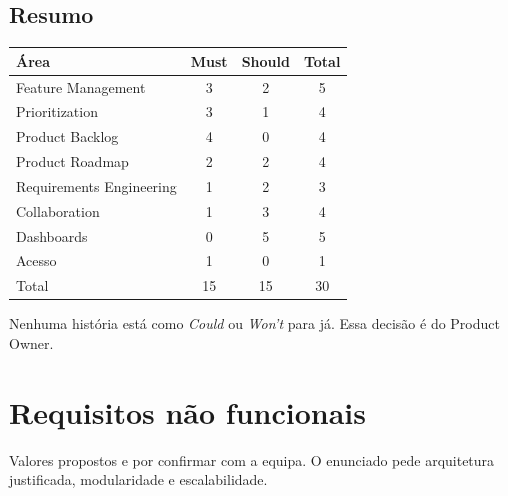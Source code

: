 \documentclass[12pt,a4paper]{article}
\begin{document}
\subsection{Resumo}

\begin{center}
\begin{tabular}{lccc}
\toprule
Área & Must & Should & Total \\
\midrule
Feature Management & 3 & 2 & 5 \\
Prioritization & 3 & 1 & 4 \\
Product Backlog & 4 & 0 & 4 \\
Product Roadmap & 2 & 2 & 4 \\
Requirements Engineering & 1 & 2 & 3 \\
Collaboration & 1 & 3 & 4 \\
Dashboards & 0 & 5 & 5 \\
Acesso & 1 & 0 & 1 \\
\midrule
Total & 15 & 15 & 30 \\
\bottomrule
\end{tabular}
\end{center}

Nenhuma história está como \textit{Could} ou \textit{Won't} para já. Essa decisão é do Product Owner.

\section{Requisitos não funcionais}

Valores propostos e por confirmar com a equipa. O enunciado pede arquitetura justificada, modularidade e escalabilidade.
\end{document}
